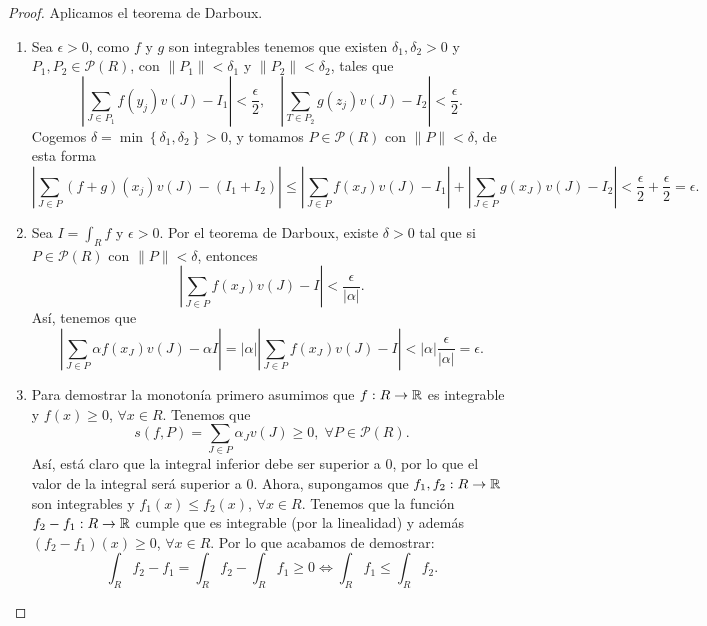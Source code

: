 \begin{proof}
	Aplicamos el teorema de Darboux.
	\begin{enumerate}
	\item Sea $\displaystyle \epsilon > 0 $, como $\displaystyle f $ y $\displaystyle g $ son integrables tenemos que existen $\displaystyle \delta _{1}, \delta _{2} > 0 $ y $\displaystyle P_{1}, P_{2} \in \mathcal{P}\left(R\right) $, con $\displaystyle \|P_{1}\| < \delta_{1} $ y $\displaystyle \|P_{2}\|<\delta_{2} $, tales que
\[ \left|\sum_{J \in P_{1}}f\left(y_{j}\right)v\left(J\right)-I_{1}\right|< \frac{\epsilon }{2}, \quad \left|\sum_{T \in P_{2}}g\left(z_{j}\right)v\left(J\right)-I_{2}\right|< \frac{\epsilon }{2}.\]
Cogemos $\displaystyle \delta = \min \left\{ \delta_{1}, \delta_{2}\right\}  > 0 $, y tomamos $\displaystyle P \in \mathcal{P}\left(R\right) $ con $\displaystyle \|P\|<\delta  $, de esta forma 
\[\left|\sum_{J \in P}\left(f + g\right)\left(x_{j}\right)v\left(J\right)-\left(I_{1} + I_{2}\right)\right| \leq \left|\sum^{}_{J \in P}f\left(x_{J}\right)v\left(J\right) - I_{1}\right| + \left|\sum^{}_{J \in P}g\left(x_{J}\right)v\left(J\right)-I_{2}\right| < \frac{\epsilon }{2} + \frac{\epsilon }{2} = \epsilon.\]
\item Sea $\displaystyle I = \int _{R}f $ y $\displaystyle \epsilon > 0 $. Por el teorema de Darboux, existe $\displaystyle \delta > 0 $ tal que si $\displaystyle P \in \mathcal{P}\left(R\right) $ con $\displaystyle \|P\| < \delta  $, entonces
	\[ \left|\sum_{J \in P}f\left(x_{J}\right)v\left(J\right)-I\right|< \frac{\epsilon }{ \left|\alpha \right|}.\]
	Así, tenemos que 
	\[ \left|\sum_{J \in P}\alpha f\left(x_{J}\right)v\left(J\right)-\alpha I\right| = \left|\alpha \right| \left|\sum_{J \in P}f\left(x_{J}\right)v\left(J\right)-I\right| < \left|\alpha \right|\frac{\epsilon }{ \left|\alpha \right|} = \epsilon  .\]
\item Para demostrar la monotonía primero asumimos que $\displaystyle f : R \to \mathbb{R} $ es integrable y $\displaystyle f\left(x\right) \geq 0 $, $\displaystyle \forall x \in R $. Tenemos que 
	\[s\left(f,P\right) = \sum_{J \in P} \alpha_{J} v\left(J\right) \geq 0, \; \forall P \in \mathcal{P}\left(R\right) .\]
Así, está claro que la integral inferior debe ser superior a 0, por lo que el valor de la integral será superior a 0. Ahora, supongamos que $\displaystyle f_{1}, f_{2} : R \to \mathbb{R} $ son integrables y $\displaystyle f_{1}\left(x\right) \leq f_{2} \left(x\right)$, $\displaystyle \forall x \in R $. Tenemos que la función $\displaystyle f_{2}-f_{1} : R \to \mathbb{R} $ cumple que es integrable (por la linealidad) y además $\displaystyle \left(f_{2}-f_{1}\right)\left(x\right) \geq 0 $, $\displaystyle \forall x \in R $. Por lo que acabamos de demostrar:
\[\int _{R}f_{2}-f_{1} = \int_{R} f_{2} - \int _{R}f_{1} \geq 0 \iff \int _{R}f_{1} \leq \int _{R}f_{2}  .\]
	\end{enumerate}
\end{proof}

